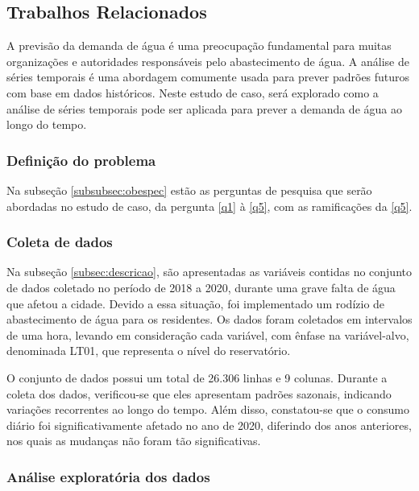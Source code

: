 \subsection{Trabalhos Relacionados}\label{subsec:estudo-de-caso-base}


A previsão da demanda de água é uma preocupação fundamental para muitas organizações e autoridades responsáveis pelo abastecimento de água. A análise de séries temporais é uma abordagem comumente usada para prever padrões futuros com base em dados históricos. Neste estudo de caso, será explorado como a análise de séries temporais pode ser aplicada para prever a demanda de água ao longo do tempo.



\subsubsection{Defini\c c\~ao do problema}



Na subseção \ref{subsubsec:obespec} estão as perguntas de pesquisa que serão abordadas no estudo de caso, da pergunta \ref{q1} à \ref{q5}, com as ramificações da \ref{q5}.

\subsubsection{Coleta de dados}


Na subseção \ref{subsec:descricao}, são apresentadas as variáveis contidas no conjunto de dados coletado no período de 2018 a 2020, durante uma grave falta de água que afetou a cidade. Devido a essa situação, foi implementado um rodízio de abastecimento de água para os residentes. Os dados foram coletados em intervalos de uma hora, levando em consideração cada variável, com ênfase na variável-alvo, denominada LT01, que representa o nível do reservatório.

O conjunto de dados possui um total de 26.306 linhas e 9 colunas. Durante a coleta dos dados, verificou-se que eles apresentam padrões sazonais, indicando variações recorrentes ao longo do tempo. Além disso, constatou-se que o consumo diário foi significativamente afetado no ano de 2020, diferindo dos anos anteriores, nos quais as mudanças não foram tão significativas.



\subsubsection{An\'alise explorat\'oria dos dados}



